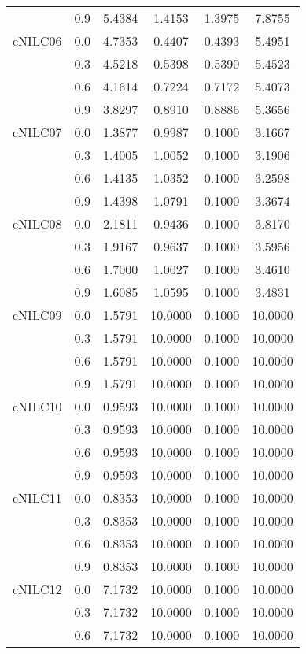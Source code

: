 \begin{longtable}{cccccc}
        & 0.9 & 5.4384 & 1.4153 & 1.3975 & 7.8755 \\
cNILC06 & 0.0 & 4.7353 & 0.4407 & 0.4393 & 5.4951 \\
        & 0.3 & 4.5218 & 0.5398 & 0.5390 & 5.4523 \\
        & 0.6 & 4.1614 & 0.7224 & 0.7172 & 5.4073 \\
        & 0.9 & 3.8297 & 0.8910 & 0.8886 & 5.3656 \\
cNILC07 & 0.0 & 1.3877 & 0.9987 & 0.1000 & 3.1667 \\
        & 0.3 & 1.4005 & 1.0052 & 0.1000 & 3.1906 \\
        & 0.6 & 1.4135 & 1.0352 & 0.1000 & 3.2598 \\
        & 0.9 & 1.4398 & 1.0791 & 0.1000 & 3.3674 \\
cNILC08 & 0.0 & 2.1811 & 0.9436 & 0.1000 & 3.8170 \\
        & 0.3 & 1.9167 & 0.9637 & 0.1000 & 3.5956 \\
        & 0.6 & 1.7000 & 1.0027 & 0.1000 & 3.4610 \\
        & 0.9 & 1.6085 & 1.0595 & 0.1000 & 3.4831 \\
cNILC09 & 0.0 & 1.5791 & 10.0000 & 0.1000 & 10.0000 \\
        & 0.3 & 1.5791 & 10.0000 & 0.1000 & 10.0000 \\
        & 0.6 & 1.5791 & 10.0000 & 0.1000 & 10.0000 \\
        & 0.9 & 1.5791 & 10.0000 & 0.1000 & 10.0000 \\
cNILC10 & 0.0 & 0.9593 & 10.0000 & 0.1000 & 10.0000 \\
        & 0.3 & 0.9593 & 10.0000 & 0.1000 & 10.0000 \\
        & 0.6 & 0.9593 & 10.0000 & 0.1000 & 10.0000 \\
        & 0.9 & 0.9593 & 10.0000 & 0.1000 & 10.0000 \\
cNILC11 & 0.0 & 0.8353 & 10.0000 & 0.1000 & 10.0000 \\
        & 0.3 & 0.8353 & 10.0000 & 0.1000 & 10.0000 \\
        & 0.6 & 0.8353 & 10.0000 & 0.1000 & 10.0000 \\
        & 0.9 & 0.8353 & 10.0000 & 0.1000 & 10.0000 \\
cNILC12 & 0.0 & 7.1732 & 10.0000 & 0.1000 & 10.0000 \\
        & 0.3 & 7.1732 & 10.0000 & 0.1000 & 10.0000 \\
        & 0.6 & 7.1732 & 10.0000 & 0.1000 & 10.0000 \\

\end{longtable}
